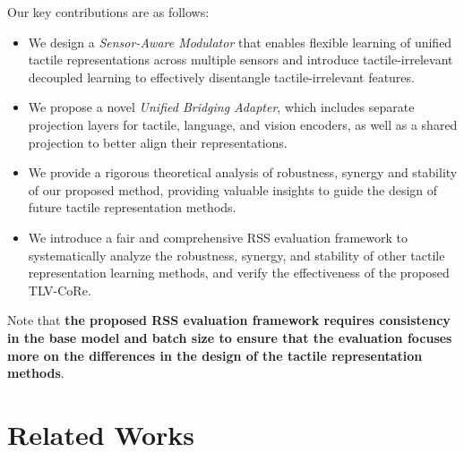 \documentclass[letterpaper]{article} %
\theoremstyle{definition}                %
\theoremstyle{plain}                     %
\theoremstyle{remark}                    %
\begin{document}
Our key contributions are as follows:
\begin{itemize}[leftmargin=*, itemsep=0pt, topsep=0pt]
    \item{We design a \textit{Sensor-Aware Modulator} that enables flexible learning of unified tactile representations across multiple sensors and introduce tactile-irrelevant decoupled learning to effectively disentangle tactile-irrelevant features.}
    \item{We propose a novel \textit{Unified Bridging Adapter}, which includes separate projection layers for tactile, language, and vision encoders, as well as a shared projection to better align their representations.}
    \item{We provide a rigorous theoretical analysis of robustness, synergy and stability of our proposed method, providing valuable insights to guide the design of future tactile representation methods.}
    \item{We introduce a fair and comprehensive RSS evaluation framework to systematically analyze the robustness, synergy, and stability of other tactile representation learning methods, and verify the effectiveness of the proposed TLV-CoRe.}
\end{itemize}

Note that \textbf{the proposed RSS evaluation framework requires consistency in the base model and batch size to ensure that the evaluation focuses more on the differences in the design of the tactile representation methods}.




\section{Related Works}
\label{sec:related_works}
\end{document}
